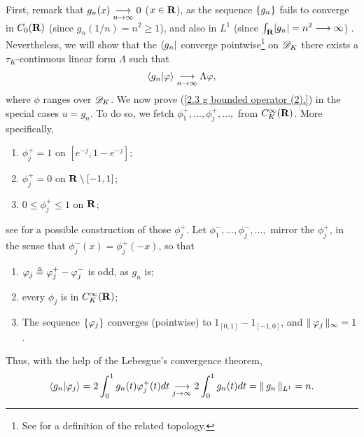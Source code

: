 %
First, remark that $g_n(x) \tendsto{n}{\infty} 0$ ($x \in \R$), %
as the sequence $\singleton{g_n}$ fails to converge in $C_0(\R)$ %
%
  (since $g_n(1/n)= n^2 \geq 1$),  %
%
and also in $L^1$ %
%
  (since $\int_\R \lvert g_n \rvert = n^2 \longrightarrow{\infty}$)
. %
Nevertheless, we will show that %
%
  the $\bra{g_n}$ %
%
converge pointwise\footnote{
%
  See  for a definition of the related topology. %
%
} on $\D_K$ %
\ie %
there exists a $\tau_K$-continuous linear form $\Lambda$ such that %
%
  \begin{align}\label{2.3. Convergence in D_K, not vague.}
    \bra{g_n}\ket{\phi} \tendsto{n}{\infty} \Lambda \phi, %
  \end{align}
%
where $\phi$ ranges over $\D_K$. %
%
We now prove (\ref{2.3  g  bounded operator (2).}) in the special cases %
%
  $u = g_n$. %
%
To do so, we fetch %
%
  $\phi^{+}_{1}, \dots, \phi^{+}_{j}, \dots,$ from $C_K^\infty(\R)$. %
%
More specifically, %
%
  \begin{enumerate}
    \item{
      $\phi^{+}_{j} = 1$ on $[e^{\minus j}, 1-e^{\minus j}]$; 
    }%
    \item{
      $\phi^{+}_{j} = 0$ on $\R\setminus [-1, 1]$;%
    }
    \item{
      $0 \leq \phi^{+}_{j} \leq 1$ on $\R$; %
    }
  \end{enumerate}
%
see \citeresultFA{[1.46]} for a possible construction of those $\phi^{+}_{j}$. 
%
Let %
%
  $\phi^{-}_{1}, \dots, \phi^{-}_{j}, \dots,$ %
%
mirror the $\phi^{+}_{j}$, in the sense that %
%
  $\phi^{-}_{j}(x) = \phi^{+}_{j}(\minus x)$, %
%
so that %
%
  \begin{enumerate}\addtocounter{enumi}{3}
    \item{
      $\phi_{j} \Def \phi^{+}_{j} - \phi^{-}_{j}$ is odd, as $g_n$ is;
    }
    \item{
      every $\phi_{j}$ is in $C_K^\infty(\R)$;
    }
    \item{
      The sequence $\singleton{\phi_j}$ converges (pointwise) to %
      $1_{[0, 1]} - 1_{[\minus 1, 0]}$, and $\norm{\infty}{\phi_{j}} = 1$. %
    }
  \end{enumerate}
%
Thus, with the help of the Lebesgue's convergence theorem, 
%
  \begin{align}\label{2.3. Norm in the dual equals norm L1 (1).}
      \langle{g_n}\lvert{\phi_j}\rangle
      = 
    2 \int_{0}^1 g_n(t) \phi^{+}_{j}(t) d t
      \tendsto{j}{\infty} 
    2 \int_{0}^1 g_n(t) d t
      = \norm{L^1}{g_n} = n.
  \end{align}
